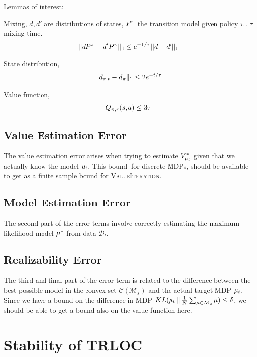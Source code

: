 
Lemmas of interest:

Mixing, $d, d'$ are distributions of states, $P^\pi$ the transition model given policy $\pi$. $\tau$ mixing time.
\begin{equation}
    ||d P^\pi - d' P^\pi||_1 \leq e^{-1/\tau}||d-d'||_1
\end{equation}

State distribution,
\begin{equation}
    ||d_{\pi, t}-d_\pi||_1 \leq 2e^{-t/\tau}
\end{equation}

Value function,
\begin{equation}
    Q_{\pi, r}(s, a) \leq 3\tau
\end{equation}

\subsection{Value Estimation Error}

The value estimation error arises when trying to estimate $V^{*}_{\mu_t}$ given that we actually know the model $\mu_t$. This bound, for discrete MDPs, should be available to get as a finite sample bound for \textsc{ValueIteration}.

\subsection{Model Estimation Error}

The second part of the error terms involve correctly estimating the maximum likelihood-model $\mu^{*}$ from data $\mathcal{D}_t$.

\subsection{Realizability Error}

The third and final part of the error term is related to the difference between the best possible model in the convex set $\mathcal{C}(\mathcal{M}_s)$ and the actual target MDP $\mu_t$. Since we have a bound on the difference in MDP $KL(\mu_t \, || \, \frac{1}{N}\sum_{\mu \in \mathcal{M}_s} \mu) \leq \delta$, we should be able to get a bound also on the value function here.

\iffalse
\section{Stability of TRLOC}\label{sec:stability}

